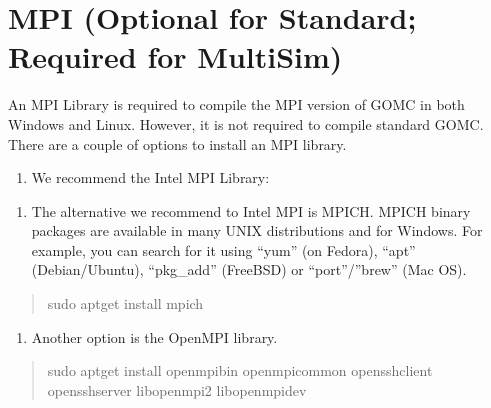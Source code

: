 \documentclass[letterpaper,10pt,english]{sphinxmanual}
\begin{document}
\section{MPI (Optional for Standard; Required for MultiSim)}
\label{\detokenize{software_requirements:mpi-optional-for-standard-required-for-multisim}}
An MPI Library is required to compile the MPI version of GOMC in both Windows and Linux.  However, it is not required to compile standard GOMC.  There are a couple of options to install an MPI library.
\begin{enumerate}
%
\item {} 
We recommend the Intel MPI Library:

\end{enumerate}
\begin{quote}

\end{quote}
\begin{enumerate}
%
\setcounter{enumi}{1}
\item {} 
The alternative we recommend to Intel MPI is MPICH. MPICH binary packages are available in many UNIX distributions and for Windows. For example, you can search for it using “yum” (on Fedora), “apt” (Debian/Ubuntu), “pkg\_add” (FreeBSD) or “port”/”brew” (Mac OS).

\end{enumerate}
\begin{quote}

\begin{sphinxVerbatim}[commandchars=\\\{\}]
\PYGZdl{} sudo apt\PYGZhy{}get install mpich
\end{sphinxVerbatim}
\end{quote}
\begin{enumerate}
%
\setcounter{enumi}{2}
\item {} 
Another option is the OpenMPI library.

\end{enumerate}
\begin{quote}

\begin{sphinxVerbatim}[commandchars=\\\{\}]
\PYGZdl{} sudo apt\PYGZhy{}get install openmpi\PYGZhy{}bin openmpi\PYGZhy{}common openssh\PYGZhy{}client openssh\PYGZhy{}server libopenmpi2 libopenmpi\PYGZhy{}dev
\end{sphinxVerbatim}
\end{quote}
\end{document}
